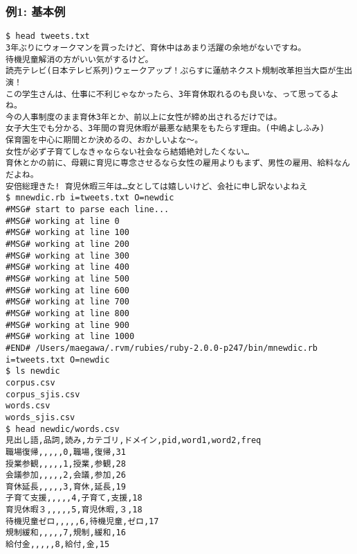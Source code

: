 \subsubsection*{例1: 基本例}



\begin{Verbatim}[baselinestretch=0.7,frame=single]
$ head tweets.txt
3年ぶりにウォークマンを買ったけど、育休中はあまり活躍の余地がないですね。
待機児童解消の方がいい気がするけど。
読売テレビ(日本テレビ系列)ウェークアップ！ぷらすに蓮舫ネクスト規制改革担当大臣が生出演！
この学生さんは、仕事に不利じゃなかったら、3年育休取れるのも良いな、って思ってるよね。
今の人事制度のまま育休3年とか、前以上に女性が締め出されるだけでは。
女子大生でも分かる、3年間の育児休暇が最悪な結果をもたらす理由。(中嶋よしふみ)
保育園を中心に期間とか決めるの、おかしいよな～。
女性が必ず子育てしなきゃならない社会なら結婚絶対したくない…
育休とかの前に、母親に育児に専念させるなら女性の雇用よりもまず、男性の雇用、給料なんだよね。
安倍総理きた! 育児休暇三年は…女としては嬉しいけど、会社に申し訳ないよねえ
$ mnewdic.rb i=tweets.txt O=newdic
#MSG# start to parse each line...
#MSG# working at line 0
#MSG# working at line 100
#MSG# working at line 200
#MSG# working at line 300
#MSG# working at line 400
#MSG# working at line 500
#MSG# working at line 600
#MSG# working at line 700
#MSG# working at line 800
#MSG# working at line 900
#MSG# working at line 1000
#END# /Users/maegawa/.rvm/rubies/ruby-2.0.0-p247/bin/mnewdic.rb i=tweets.txt O=newdic
$ ls newdic
corpus.csv
corpus_sjis.csv
words.csv
words_sjis.csv
$ head newdic/words.csv
見出し語,品詞,読み,カテゴリ,ドメイン,pid,word1,word2,freq
職場復帰,,,,,0,職場,復帰,31
授業参観,,,,,1,授業,参観,28
会議参加,,,,,2,会議,参加,26
育休延長,,,,,3,育休,延長,19
子育て支援,,,,,4,子育て,支援,18
育児休暇３,,,,,5,育児休暇,３,18
待機児童ゼロ,,,,,6,待機児童,ゼロ,17
規制緩和,,,,,7,規制,緩和,16
給付金,,,,,8,給付,金,15
\end{Verbatim}

